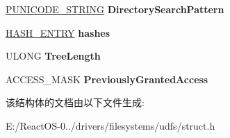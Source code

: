 \begin{DoxyCompactItemize}
\hyperlink{struct___u_n_i_c_o_d_e___s_t_r_i_n_g}{P\+U\+N\+I\+C\+O\+D\+E\+\_\+\+S\+T\+R\+I\+NG} {\bfseries Directory\+Search\+Pattern}
\item 
\mbox{\label{struct___u_d_f_context_control_block_a4b0384f2356e6c0db147433602d70f08}} 
\hyperlink{struct___h_a_s_h___e_n_t_r_y}{H\+A\+S\+H\+\_\+\+E\+N\+T\+RY} {\bfseries hashes}
\item 
\mbox{\label{struct___u_d_f_context_control_block_a06b489d7157165db59713cc5f9a13b09}} 
U\+L\+O\+NG {\bfseries Tree\+Length}
\item 
\mbox{\label{struct___u_d_f_context_control_block_ae97944f537811cb826c570e3779c2859}} 
A\+C\+C\+E\+S\+S\+\_\+\+M\+A\+SK {\bfseries Previously\+Granted\+Access}
\end{DoxyCompactItemize}


该结构体的文档由以下文件生成\+:\begin{DoxyCompactItemize}
\item 
E\+:/\+React\+O\+S-\/0../drivers/filesystems/udfs/struct.\+h\end{DoxyCompactItemize}
